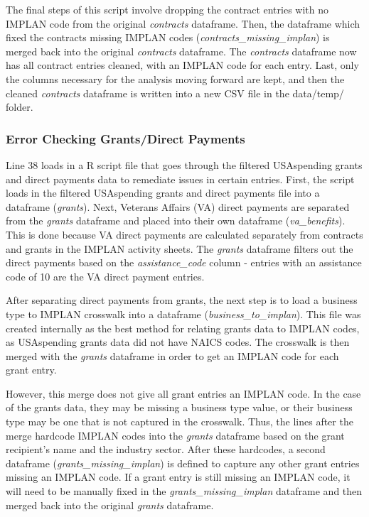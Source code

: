 \documentclass[
]{book}
\begin{document}
The final steps of this script involve dropping the contract entries with no IMPLAN code from the original \emph{contracts} dataframe. Then, the dataframe which fixed the contracts missing IMPLAN codes (\emph{contracts\_missing\_implan}) is merged back into the original \emph{contracts} dataframe. The \emph{contracts} dataframe now has all contract entries cleaned, with an IMPLAN code for each entry. Last, only the columns necessary for the analysis moving forward are kept, and then the cleaned \emph{contracts} dataframe is written into a new CSV file in the data/temp/ folder.

\hypertarget{error-grants}{%
\subsubsection{Error Checking Grants/Direct Payments}\label{error-grants}}

Line 38 loads in a R script file that goes through the filtered USAspending grants and direct payments data to remediate issues in certain entries. First, the script loads in the filtered USAspending grants and direct payments file into a dataframe (\emph{grants}). Next, Veterans Affairs (VA) direct payments are separated from the \emph{grants} dataframe and placed into their own dataframe (\emph{va\_benefits}). This is done because VA direct payments are calculated separately from contracts and grants in the IMPLAN activity sheets. The \emph{grants} dataframe filters out the direct payments based on the \emph{assistance\_code} column - entries with an assistance code of 10 are the VA direct payment entries.

After separating direct payments from grants, the next step is to load a business type to IMPLAN crosswalk into a dataframe (\emph{business\_to\_implan}). This file was created internally as the best method for relating grants data to IMPLAN codes, as USAspending grants data did not have NAICS codes. The crosswalk is then merged with the \emph{grants} dataframe in order to get an IMPLAN code for each grant entry.

However, this merge does not give all grant entries an IMPLAN code. In the case of the grants data, they may be missing a business type value, or their business type may be one that is not captured in the crosswalk. Thus, the lines after the merge hardcode IMPLAN codes into the \emph{grants} dataframe based on the grant recipient's name and the industry sector. After these hardcodes, a second dataframe (\emph{grants\_missing\_implan}) is defined to capture any other grant entries missing an IMPLAN code. If a grant entry is still missing an IMPLAN code, it will need to be manually fixed in the \emph{grants\_missing\_implan} dataframe and then merged back into the original \emph{grants} dataframe.
\end{document}
